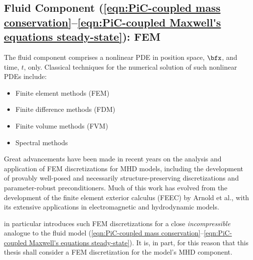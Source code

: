 \subsection*{Fluid Component (\ref{eqn:PiC-coupled mass conservation}--\ref{eqn:PiC-coupled Maxwell's equations steady-state}): FEM}
    The fluid component comprises a nonlinear PDE in position space, $\bfx$, and time, $t$, only. Classical techniques for the numerical solution of such nonlinear PDEs include:
    \begin{itemize}
        \item  Finite element methods (FEM)
        \item  Finite difference methods (FDM)
        \item  Finite volume methods (FVM)
        \item  Spectral methods
    \end{itemize}
    Great advancements have been made in recent years on the analysis and application of FEM discretizations for MHD models, including the development of provably well-posed and necessarily structure-preserving discretizations and parameter-robust preconditioners. \cite{Hu_Xu_2015, Hu_Ma_Xu_2017, Hu_Lee_Xu_2021, Green_et_al_2022, LFM22, Laakmann_Hu_Farrell_2022} Much of this work has evolved from the development of the finite element exterior calculus (FEEC) by Arnold et al., with its extensive applications in electromagnetic and hydrodynamic models. \cite{Arnold_Falk_Winther_2006, Arnold_Falk_Winther_2009, Arnold_2018}
    
    \cite{Laakmann_Hu_Farrell_2022} in particular introduces such FEM discretizations for a close \emph{incompressible} analogue to the fluid model (\ref{eqn:PiC-coupled mass conservation}--\ref{eqn:PiC-coupled Maxwell's equations steady-state}). It is, in part, for this reason that this thesis shall consider a FEM discretization for the model's MHD component.
    